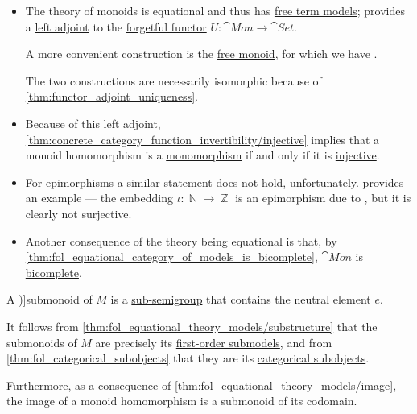 \begin{definition}
\begin{thmenum}
\begin{itemize}
      \item The theory of monoids is equational and thus has \hyperref[def:fol_free_term_model]{free term models};  provides a \hyperref[def:adjoint_functor]{left adjoint} to the \hyperref[def:fol_theory_forgetful_functor/set]{forgetful functor} \( U: \cat{Mon} \to \cat{Set} \).

      A more convenient construction is the \hyperref[def:free_monoid]{free monoid}, for which we have .

      The two constructions are necessarily isomorphic because of \cref{thm:functor_adjoint_uniqueness}.

      \item Because of this left adjoint, \cref{thm:concrete_category_function_invertibility/injective} implies that a monoid homomorphism is a \hyperref[def:morphism_cancellation/left]{monomorphism} if and only if it is \hyperref[def:function_invertibility/injective]{injective}.

      \item For epimorphisms a similar statement does not hold, unfortunately.  provides an example --- the embedding \( \iota: \BbbN \to \BbbZ \) is an epimorphism due to , but it is clearly not surjective.

      \item Another consequence of the theory being equational is that, by \cref{thm:fol_equational_category_of_models_is_bicomplete}, \( \cat{Mon} \) is \hyperref[def:bicomplete_category]{bicomplete}.
    \end{itemize}

     A \term[ru=подмоноид (\cite[148]{БелоусовТкачёв2004ДискретнаяМатематика})]{submonoid} of \( M \) is a \hyperref[def:semigroup/subobject]{sub-semigroup} that contains the neutral element \( e \).

    It follows from \cref{thm:fol_equational_theory_models/substructure} that the submonoids of \( M \) are precisely its \hyperref[def:fol_substructure/submodel]{first-order submodels}, and from \cref{thm:fol_categorical_subobjects} that they are its \hyperref[def:categorical_subobject]{categorical subobjects}.

    Furthermore, as a consequence of \cref{thm:fol_equational_theory_models/image}, the image of a monoid homomorphism is a submonoid of its codomain.


\end{thmenum}
\end{definition}
